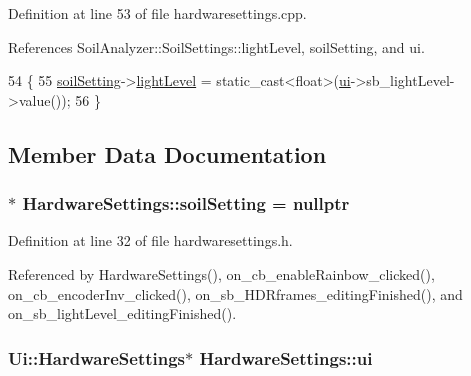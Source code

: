 Definition at line 53 of file hardwaresettings.\+cpp.



References Soil\+Analyzer\+::\+Soil\+Settings\+::light\+Level, soil\+Setting, and ui.


\begin{DoxyCode}
54 \{
55     \hyperlink{class_hardware_settings_a01cb694c4dbf49199d239a890639dce6}{soilSetting}->\hyperlink{class_soil_analyzer_1_1_soil_settings_aa4d3ed8c1ab6551bfa4763e8a1ffc148}{lightLevel} = \textcolor{keyword}{static\_cast<}\textcolor{keywordtype}{float}\textcolor{keyword}{>}(\hyperlink{class_hardware_settings_ae46cc8fe1f4247ab95bedf9bd5c14557}{ui}->sb\_lightLevel->value());
56 \}
\end{DoxyCode}


\subsection{Member Data Documentation}
\hypertarget{class_hardware_settings_a01cb694c4dbf49199d239a890639dce6}{}
\subsubsection[{soil\+Setting}]{$\ast$ Hardware\+Settings\+::soil\+Setting = nullptr\hspace{0.3cm}{\ttfamily [private]}}\label{class_hardware_settings_a01cb694c4dbf49199d239a890639dce6}


Definition at line 32 of file hardwaresettings.\+h.



Referenced by Hardware\+Settings(), on\+\_\+cb\+\_\+enable\+Rainbow\+\_\+clicked(), on\+\_\+cb\+\_\+encoder\+Inv\+\_\+clicked(), on\+\_\+sb\+\_\+\+H\+D\+Rframes\+\_\+editing\+Finished(), and on\+\_\+sb\+\_\+light\+Level\+\_\+editing\+Finished().

\hypertarget{class_hardware_settings_ae46cc8fe1f4247ab95bedf9bd5c14557}{}
\subsubsection[{ui}]{\setlength{\rightskip}{0pt plus 5cm}Ui\+::\+Hardware\+Settings$\ast$ Hardware\+Settings\+::ui\hspace{0.3cm}{\ttfamily [private]}}\label{class_hardware_settings_ae46cc8fe1f4247ab95bedf9bd5c14557}


